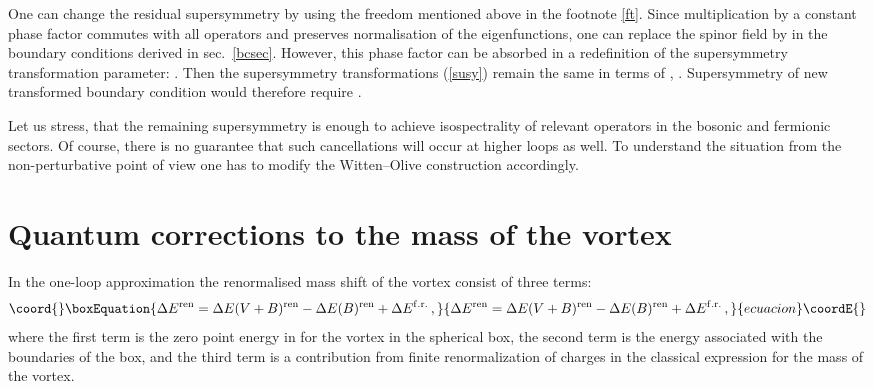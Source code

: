 \documentclass[a4paper,12pt]{article}
\begin{document}
One can change the residual supersymmetry
by using the freedom mentioned above
in the footnote \ref{ft}. Since multiplication by
a constant phase factor commutes with all operators and preserves 
normalisation of the eigenfunctions, one can replace the spinor
field \coordHE{} by \coordHE{}
in the boundary conditions derived in sec.\ \ref{bcsec}. However,
this phase factor can be absorbed in a redefinition of the
supersymmetry transformation parameter: 
\coordHE{}. Then the supersymmetry 
transformations (\ref{susy}) remain the same in terms of 
\coordHE{}, \myHighlight{$\eta_\kappa$}\coordHE{}. Supersymmetry of new transformed
boundary condition would therefore require \coordHE{}.

Let us stress, that the remaining supersymmetry is enough
 to achieve isospectrality of relevant
operators in the bosonic and fermionic sectors. 
Of course, there is no guarantee that such cancellations
will occur at higher loops as well. To understand the situation
from the non-perturbative point of view one has to modify the
Witten--Olive construction \cite{Witten:mh}  accordingly.

\section{Quantum corrections to the mass of the vortex}\label{masssec}
In the one-loop approximation the renormalised mass shift of the
vortex consist of three terms:
\begin{equation}\coord{}\boxEquation{
\Delta E^{\rm ren} = \Delta E(V+B)^{\rm ren} - \Delta E (B)^{\rm
ren} + \Delta E^{\rm f.r.} \,,\label{DE3DE}
}{
\Delta E^{\rm ren} = \Delta E(V+B)^{\rm ren} - \Delta E (B)^{\rm
ren} + \Delta E^{\rm f.r.} \,,}{ecuacion}\coordE{}\end{equation}
where the first term is the zero point energy in for the vortex in
the spherical box, the second term is the energy associated with
the boundaries of the box, and the third term is a contribution
from finite renormalization  of charges in the classical
expression for the mass of the vortex.
\end{document}

